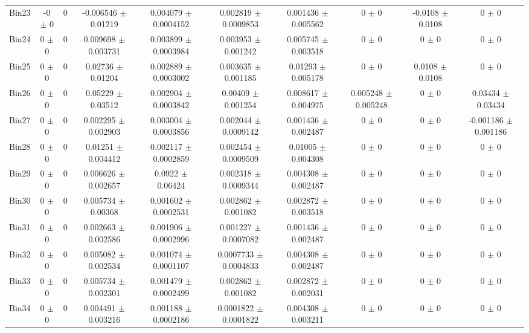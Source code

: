 \begin{tabular}{@{\extracolsep{4pt}}lccccccccc@{}}
     Bin23 & -0 $\pm$ 0 & 0 & -0.006546 $\pm$ 0.01219 & 0.004079 $\pm$ 0.0004152 & 0.002819 $\pm$ 0.0009853 & 0.001436 $\pm$ 0.005562 & 0 $\pm$ 0 & -0.0108 $\pm$ 0.0108 & 0 $\pm$ 0 \\ 
     Bin24 & 0 $\pm$ 0 & 0 & 0.009698 $\pm$ 0.003731 & 0.003899 $\pm$ 0.0003984 & 0.003953 $\pm$ 0.001242 & 0.005745 $\pm$ 0.003518 & 0 $\pm$ 0 & 0 $\pm$ 0 & 0 $\pm$ 0 \\ 
     Bin25 & 0 $\pm$ 0 & 0 & 0.02736 $\pm$ 0.01204 & 0.002889 $\pm$ 0.0003002 & 0.003635 $\pm$ 0.001185 & 0.01293 $\pm$ 0.005178 & 0 $\pm$ 0 & 0.0108 $\pm$ 0.0108 & 0 $\pm$ 0 \\ 
     Bin26 & 0 $\pm$ 0 & 0 & 0.05229 $\pm$ 0.03512 & 0.002904 $\pm$ 0.0003842 & 0.00409 $\pm$ 0.001254 & 0.008617 $\pm$ 0.004975 & 0.005248 $\pm$ 0.005248 & 0 $\pm$ 0 & 0.03434 $\pm$ 0.03434 \\ 
     Bin27 & 0 $\pm$ 0 & 0 & 0.002295 $\pm$ 0.002903 & 0.003004 $\pm$ 0.0003856 & 0.002044 $\pm$ 0.0009142 & 0.001436 $\pm$ 0.002487 & 0 $\pm$ 0 & 0 $\pm$ 0 & -0.001186 $\pm$ 0.001186 \\ 
     Bin28 & 0 $\pm$ 0 & 0 & 0.01251 $\pm$ 0.004412 & 0.002117 $\pm$ 0.0002859 & 0.002454 $\pm$ 0.0009509 & 0.01005 $\pm$ 0.004308 & 0 $\pm$ 0 & 0 $\pm$ 0 & 0 $\pm$ 0 \\ 
     Bin29 & 0 $\pm$ 0 & 0 & 0.006626 $\pm$ 0.002657 & 0.0922 $\pm$ 0.06424 & 0.002318 $\pm$ 0.0009344 & 0.004308 $\pm$ 0.002487 & 0 $\pm$ 0 & 0 $\pm$ 0 & 0 $\pm$ 0 \\ 
     Bin30 & 0 $\pm$ 0 & 0 & 0.005734 $\pm$ 0.00368 & 0.001602 $\pm$ 0.0002531 & 0.002862 $\pm$ 0.001082 & 0.002872 $\pm$ 0.003518 & 0 $\pm$ 0 & 0 $\pm$ 0 & 0 $\pm$ 0 \\ 
     Bin31 & 0 $\pm$ 0 & 0 & 0.002663 $\pm$ 0.002586 & 0.001906 $\pm$ 0.0002996 & 0.001227 $\pm$ 0.0007082 & 0.001436 $\pm$ 0.002487 & 0 $\pm$ 0 & 0 $\pm$ 0 & 0 $\pm$ 0 \\ 
     Bin32 & 0 $\pm$ 0 & 0 & 0.005082 $\pm$ 0.002534 & 0.001074 $\pm$ 0.0001107 & 0.0007733 $\pm$ 0.0004833 & 0.004308 $\pm$ 0.002487 & 0 $\pm$ 0 & 0 $\pm$ 0 & 0 $\pm$ 0 \\ 
     Bin33 & 0 $\pm$ 0 & 0 & 0.005734 $\pm$ 0.002301 & 0.001479 $\pm$ 0.0002499 & 0.002862 $\pm$ 0.001082 & 0.002872 $\pm$ 0.002031 & 0 $\pm$ 0 & 0 $\pm$ 0 & 0 $\pm$ 0 \\ 
     Bin34 & 0 $\pm$ 0 & 0 & 0.004491 $\pm$ 0.003216 & 0.001188 $\pm$ 0.0002186 & 0.0001822 $\pm$ 0.0001822 & 0.004308 $\pm$ 0.003211 & 0 $\pm$ 0 & 0 $\pm$ 0 & 0 $\pm$ 0 \\ 

\end{tabular}
